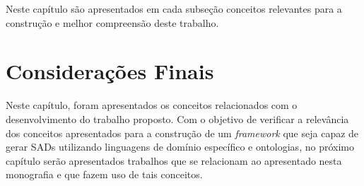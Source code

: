 Neste capítulo são apresentados em cada subseção conceitos relevantes para a construção e melhor compreensão deste trabalho.





\section{Considerações Finais}

Neste capítulo, foram apresentados os conceitos relacionados com o desenvolvimento do trabalho proposto. Com o objetivo de verificar a relevância dos conceitos apresentados para a construção de um \textit{framework} que seja capaz de gerar SADs utilizando linguagens de domínio específico e ontologias, no próximo capítulo serão apresentados trabalhos que se relacionam ao apresentado nesta monografia e que fazem uso de tais conceitos. 